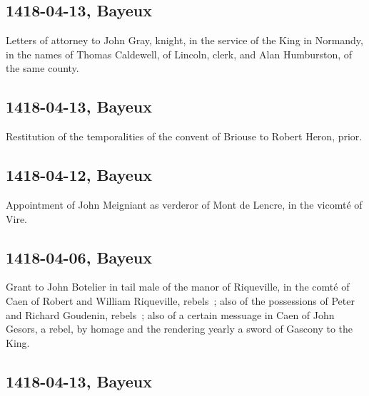 \documentclass[a4paper,12pt,twoside]{book}
\begin{document}
                
                \subsection{1418-04-13, Bayeux}
                
                
                     Letters of attorney to John Gray, knight, in the service of the King in Normandy, in the names of Thomas Caldewell, of Lincoln, clerk, and Alan Humburston, of the same county.
                  
                
                \subsection{1418-04-13, Bayeux}
                
                
                     Restitution of the temporalities of the convent of Briouse to Robert Heron, prior.
                  
                
                \subsection{1418-04-12, Bayeux}
                
                
                     Appointment of John Meigniant as verderor of Mont de Lencre, in the vicomté of Vire.
                  
                
                \subsection{1418-04-06, Bayeux}
                
                
                     Grant to John Botelier in tail male of the manor of Riqueville, in the comté of Caen of Robert and William Riqueville, rebels ; also of the possessions of Peter and Richard Goudenin, rebels ; also of a certain messuage in Caen of John Gesors, a rebel, by homage and the rendering yearly a sword of Gascony to the King.
                  
                
                \subsection{1418-04-13, Bayeux}
                
\end{document}
